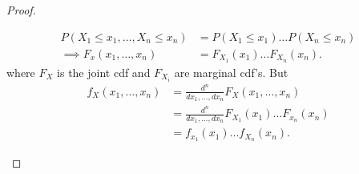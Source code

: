 \begin{theorem}
\begin{proof}
\begin{description}
\begin{align*}
				P\left( X_1 \le x_1 ,\ldots, X_{n} \le x_{n} \right) &= P\left( X_1 \le  x_1 \right)  \ldots P\left( X_{n} \le x_{n} \right)  \\
				\implies F_{x}\left( x_1, \ldots , x_{n} \right)  &= F_{X_1} \left( x_1 \right) \ldots F_{X_{n}}\left( x_{n} \right) 
			.\end{align*}
			where $F_{X}$ is the joint cdf and $F_{X_{i}}$ are marginal cdf's. But
			\begin{align*}
				f_{X}\left( x_{1} , \ldots , x_{n} \right) &= \frac{d^{n}}{dx_{1} , \ldots , dx_{n}} F_{X} \left( x_{1} , \ldots , x_{n} \right) \\
									   &= \frac{d^{n}}{dx_{1} , \ldots , dx_{n}} F_{X_1} \left( x_1 \right)  \ldots F_{x_{n}}\left( x_{n} \right)  \\
									   &= f_{x_1}\left( x_1 \right) \ldots f_{X_{n}}\left( x_{n} \right) 
			.\end{align*}
	\end{description}
\end{proof}
\end{theorem}
